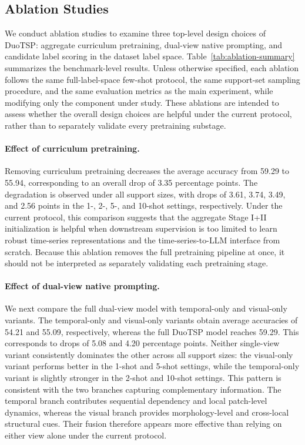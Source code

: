 \documentclass{article}
\begin{document}
\subsection{Ablation Studies}

We conduct ablation studies to examine three top-level design choices of DuoTSP: aggregate curriculum pretraining, dual-view native prompting, and candidate label scoring in the dataset label space.
Table~\ref{tab:ablation-summary} summarizes the benchmark-level results.
Unless otherwise specified, each ablation follows the same full-label-space few-shot protocol, the same support-set sampling procedure, and the same evaluation metrics as the main experiment, while modifying only the component under study.
These ablations are intended to assess whether the overall design choices are helpful under the current protocol, rather than to separately validate every pretraining substage.



\paragraph{Effect of curriculum pretraining.}
Removing curriculum pretraining decreases the average accuracy from 59.29 to 55.94, corresponding to an overall drop of 3.35 percentage points.
The degradation is observed under all support sizes, with drops of 3.61, 3.74, 3.49, and 2.56 points in the 1-, 2-, 5-, and 10-shot settings, respectively.
Under the current protocol, this comparison suggests that the aggregate Stage I+II initialization is helpful when downstream supervision is too limited to learn robust time-series representations and the time-series-to-LLM interface from scratch.
Because this ablation removes the full pretraining pipeline at once, it should not be interpreted as separately validating each pretraining stage.

\paragraph{Effect of dual-view native prompting.}
We next compare the full dual-view model with temporal-only and visual-only variants.
The temporal-only and visual-only variants obtain average accuracies of 54.21 and 55.09, respectively, whereas the full DuoTSP model reaches 59.29.
This corresponds to drops of 5.08 and 4.20 percentage points.
Neither single-view variant consistently dominates the other across all support sizes: the visual-only variant performs better in the 1-shot and 5-shot settings, while the temporal-only variant is slightly stronger in the 2-shot and 10-shot settings.
This pattern is consistent with the two branches capturing complementary information.
The temporal branch contributes sequential dependency and local patch-level dynamics, whereas the visual branch provides morphology-level and cross-local structural cues.
Their fusion therefore appears more effective than relying on either view alone under the current protocol.
\end{document}
